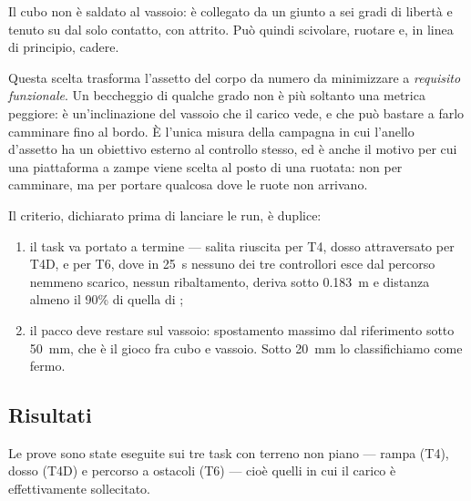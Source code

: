 Il cubo non è saldato al vassoio: è collegato da un giunto a sei gradi di
libertà e tenuto su dal solo contatto, con attrito. Può quindi scivolare,
ruotare e, in linea di principio, cadere.

Questa scelta trasforma l'assetto del corpo da numero da minimizzare a
\emph{requisito funzionale}. Un beccheggio di qualche grado non è più soltanto
una metrica peggiore: è un'inclinazione del vassoio che il carico vede, e che
può bastare a farlo camminare fino al bordo. È l'unica misura della campagna in
cui l'anello d'assetto ha un obiettivo esterno al controllo stesso, ed è anche
il motivo per cui una piattaforma a zampe viene scelta al posto di una ruotata:
non per camminare, ma per portare qualcosa dove le ruote non arrivano.

Il criterio, dichiarato prima di lanciare le run, è duplice:

\begin{enumerate}
\item il task va portato a termine --- salita riuscita per T4, dosso
attraversato per T4D, e per T6, dove in \SI{25}{\second} nessuno dei tre
controllori esce dal percorso nemmeno scarico, nessun ribaltamento, deriva
sotto \SI{0.183}{\meter} e distanza almeno il 90\% di quella di \Cth{};
\item il pacco deve restare sul vassoio: spostamento massimo dal riferimento
sotto \SI{50}{\milli\meter}, che è il gioco fra cubo e vassoio. Sotto
\SI{20}{\milli\meter} lo classifichiamo come fermo.
\end{enumerate}

\subsection{Risultati}

Le prove sono state eseguite sui tre task con terreno non piano --- rampa
(T4), dosso (T4D) e percorso a ostacoli (T6) --- cioè quelli in cui il carico
è effettivamente sollecitato.

